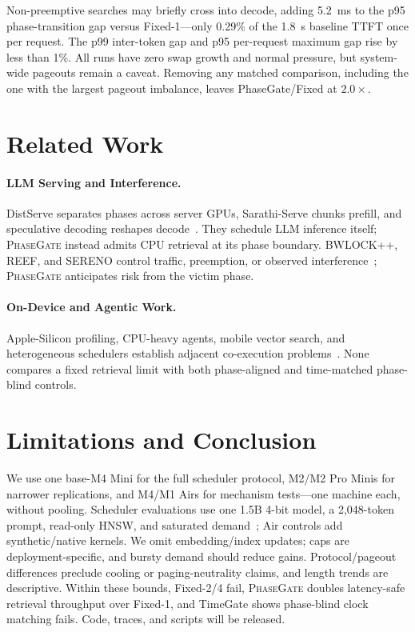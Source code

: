 \documentclass{article}
\newcommand{\system}{\textsc{PhaseGate}\xspace}
\begin{document}
Non-preemptive searches may briefly cross into decode, adding 5.2~ms to the p95 phase-transition gap versus Fixed-1---only 0.29\% of the 1.8~s baseline TTFT once per request.
The p99 inter-token gap and p95 per-request maximum gap rise by less than 1\%.
All runs have zero swap growth and normal pressure, but system-wide pageouts remain a caveat.
Removing any matched comparison, including the one with the largest pageout imbalance, leaves PhaseGate/Fixed at $2.0\times$.

\section{Related Work}

\paragraph{LLM Serving and Interference.}
DistServe separates phases across server GPUs, Sarathi-Serve chunks prefill, and speculative decoding reshapes decode~\cite{zhong2024distserve,agrawal2024sarathi,leviathan2023speculative}.
They schedule LLM inference itself; \system instead admits CPU retrieval at its phase boundary.
BWLOCK++, REEF, and SERENO control traffic, preemption, or observed interference~\cite{ali2018bwlock,han2022reef,xin2026sereno}; \system anticipates risk from the victim phase.

\paragraph{On-Device and Agentic Work.}
Apple-Silicon profiling, CPU-heavy agents, mobile vector search, and heterogeneous schedulers establish adjacent co-execution problems~\cite{benazir2025apple,raj2025cpu,zhao2026muse,lu2026agentic,wang2026mars,mohite2026fusionml}.
None compares a fixed retrieval limit with both phase-aligned and time-matched phase-blind controls.

\section{Limitations and Conclusion}

We use one base-M4 Mini for the full scheduler protocol, M2/M2 Pro Minis for narrower replications, and M4/M1 Airs for mechanism tests---one machine each, without pooling.
Scheduler evaluations use one 1.5B 4-bit model, a 2,048-token prompt, read-only HNSW, and saturated demand~\cite{malkov2020hnsw,johnson2021faiss}; Air controls add synthetic/native kernels.
We omit embedding/index updates; caps are deployment-specific, and bursty demand should reduce gains.
Protocol/pageout differences preclude cooling or paging-neutrality claims, and length trends are descriptive.
Within these bounds, Fixed-2/4 fail, \system doubles latency-safe retrieval throughput over Fixed-1, and TimeGate shows phase-blind clock matching fails.
Code, traces, and scripts will be released.
\end{document}
